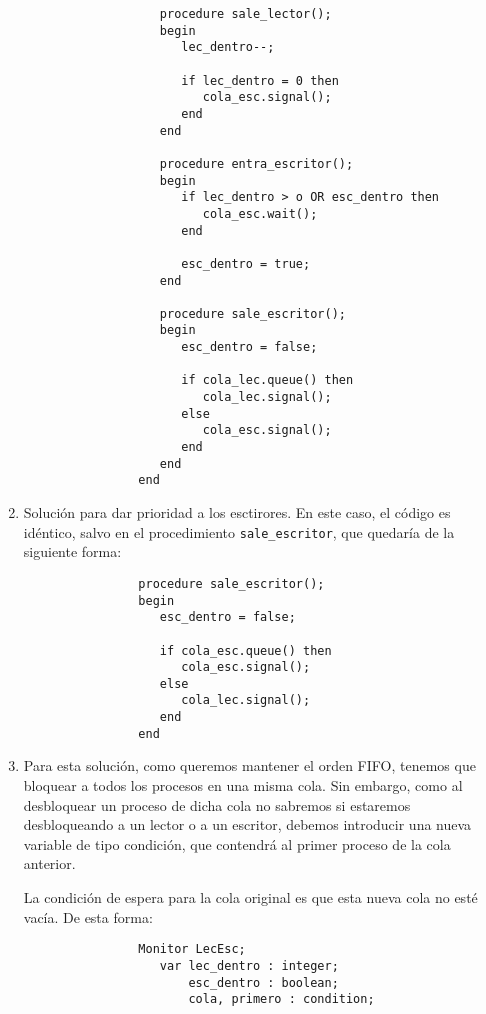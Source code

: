 \begin{ejercicio}
\begin{enumerate}
\begin{verbatim}
                   procedure sale_lector();
                   begin
                      lec_dentro--;

                      if lec_dentro = 0 then
                         cola_esc.signal();
                      end
                   end

                   procedure entra_escritor();
                   begin
                      if lec_dentro > o OR esc_dentro then
                         cola_esc.wait();
                      end

                      esc_dentro = true;
                   end

                   procedure sale_escritor();
                   begin
                      esc_dentro = false;

                      if cola_lec.queue() then
                         cola_lec.signal();
                      else
                         cola_esc.signal();
                      end
                   end
                end
            \end{verbatim}
        \item Solución para dar prioridad a los esctirores. En este caso, el código es idéntico, salvo en el procedimiento \verb|sale_escritor|, que quedaría de la siguiente forma:
            \begin{verbatim}
                procedure sale_escritor();
                begin
                   esc_dentro = false;

                   if cola_esc.queue() then
                      cola_esc.signal();
                   else
                      cola_lec.signal();
                   end
                end
            \end{verbatim}
        \item Para esta solución, como queremos mantener el orden FIFO, tenemos que bloquear a todos los procesos en una misma cola. Sin embargo, como al desbloquear un proceso de dicha cola no sabremos si estaremos desbloqueando a un lector o a un escritor, debemos introducir una nueva variable de tipo condición, que contendrá al primer proceso de la cola anterior.

            La condición de espera para la cola original es que esta nueva cola no esté vacía. De esta forma:
            \begin{verbatim}
                Monitor LecEsc;
                   var lec_dentro : integer;
                       esc_dentro : boolean;
                       cola, primero : condition;


\end{verbatim}
\end{enumerate}
\end{ejercicio}
